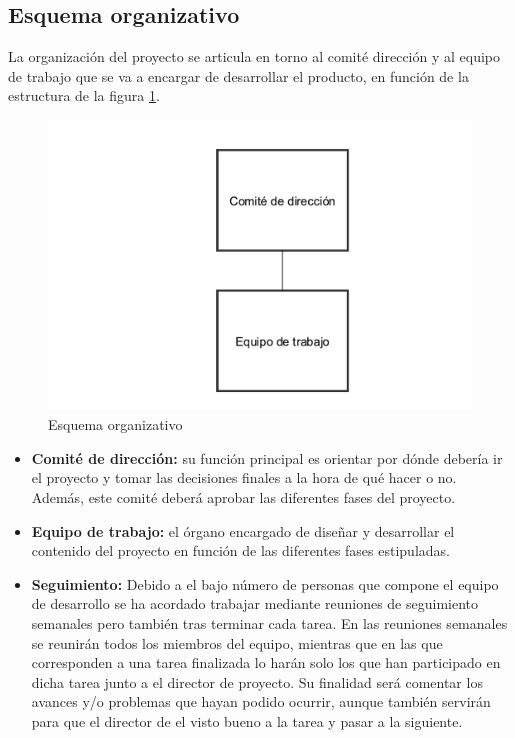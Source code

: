 \subsection{Esquema organizativo}

La organización del proyecto se articula en torno al comité dirección y al equipo de trabajo que se va a encargar de desarrollar el producto, en función de la estructura de la figura \ref{fig:org_schema}.

\begin{figure}[!htp]
	\centering
	\includegraphics[scale=.75]{fig/organization}
	\caption{Esquema organizativo}\label{fig:org_schema}
\end{figure}

\begin{itemize}
	\item \textbf{Comité de dirección:} su función principal es orientar por dónde debería ir el proyecto y tomar las decisiones finales a la hora de qué hacer o no. Además, este comité deberá aprobar las diferentes fases del proyecto.
	\item \textbf{Equipo de trabajo:} el órgano encargado de diseñar y desarrollar el contenido del proyecto en función de las diferentes fases estipuladas.
	\item \textbf{Seguimiento:} Debido a el bajo número de personas que compone el equipo de desarrollo se ha acordado trabajar mediante reuniones de seguimiento semanales pero también tras terminar cada tarea. En las reuniones semanales se reunirán todos los miembros del equipo, mientras que en las que corresponden a una tarea finalizada lo harán solo los que han participado en dicha tarea junto a el director de proyecto. Su finalidad será comentar los avances y/o problemas que hayan podido ocurrir, aunque también servirán para que el director de el visto bueno a la tarea y pasar a la siguiente. 
\end{itemize}